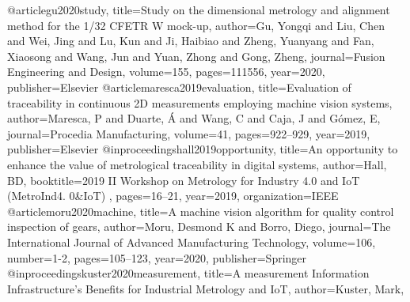 \documentclass[10pt,a4paper,onecolumn]{article}
\begin{document}
@article{gu2020study,
    title={Study on the dimensional metrology and alignment method for the 1/32 CFETR W mock-up},
    author={Gu, Yongqi and Liu, Chen and Wei, Jing and Lu, Kun and Ji, Haibiao and Zheng, Yuanyang and Fan, Xiaosong and Wang, Jun and Yuan, Zhong and Gong, Zheng},
    journal={Fusion Engineering and Design},
    volume={155},
    pages={111556},
    year={2020},
    publisher={Elsevier}
}
@article{maresca2019evaluation,
    title={Evaluation of traceability in continuous 2D measurements employing machine vision systems},
    author={Maresca, P and Duarte, {\'A} and Wang, C and Caja, J and G{\'o}mez, E},
    journal={Procedia Manufacturing},
    volume={41},
    pages={922--929},
    year={2019},
    publisher={Elsevier}
}
@inproceedings{hall2019opportunity,
    title={An opportunity to enhance the value of metrological traceability in digital systems},
    author={Hall, BD},
    booktitle={2019 II Workshop on Metrology for Industry 4.0 and IoT (MetroInd4. 0\&IoT) },
    pages={16--21},
    year={2019},
    organization={IEEE}
}
@article{moru2020machine,
    title={A machine vision algorithm for quality control inspection of gears},
    author={Moru, Desmond K and Borro, Diego},
    journal={The International Journal of Advanced Manufacturing Technology},
    volume={106},
    number={1-2},
    pages={105--123},
    year={2020},
    publisher={Springer}
}
@inproceedings{kuster2020measurement,
    title={A measurement Information Infrastructure's Benefits for Industrial Metrology and IoT},
    author={Kuster, Mark},
}
\end{document}
